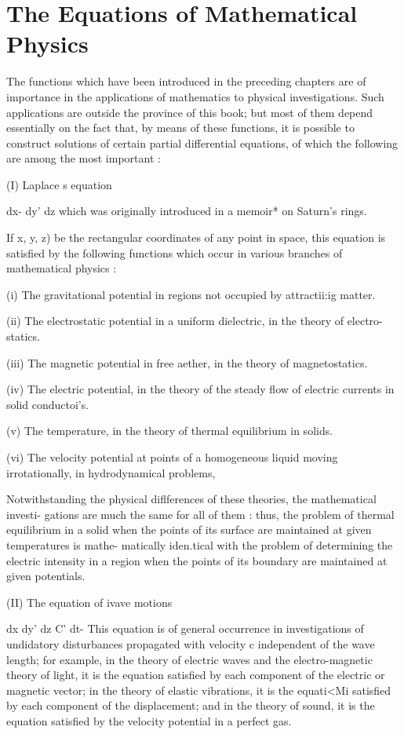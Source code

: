 \chapter{The Equations of Mathematical Physics} 


The functions which have been introduced in the preceding chapters are
of importance in the applications of mathematics to physical
investigations. Such applications are outside the province of this
book; but most of them depend essentially on the fact that, by means
of these functions, it is possible to construct solutions of certain
partial differential equations, of which the following are among the
most important :

(I) Laplace s equation

dx- dy' dz which was originally introduced in a memoir* on Saturn's
rings.

If x, y, z) be the rectangular coordinates of any point in space, this
equation is satisfied by the following functions which occur in
various branches of mathematical physics :

(i) The gravitational potential in regions not occupied by
attractii:ig matter.

(ii) The electrostatic potential in a uniform dielectric, in the
theory of electro- statics.

(iii) The magnetic potential in free aether, in the theory of
magnetostatics.

(iv) The electric potential, in the theory of the steady flow of
electric currents in solid conductoi's.

(v) The temperature, in the theory of thermal equilibrium in solids.

(vi) The velocity potential at points of a homogeneous liquid moving
irrotationally, in hydrodynamical problems,

Notwithstanding the physical diflferences of these theories, the
mathematical investi- gations are much the same for all of them :
thus, the problem of thermal equilibrium in a solid when the points of
its surface are maintained at given temperatures is mathe- matically
iden.tical with the problem of determining the electric intensity in a
region when the points of its boundary are maintained at given
potentials.

(II) The equation of ivave motions

dx dy' dz C' dt- This equation is of general occurrence in
investigations of undidatory disturbances propagated with velocity c
independent of the wave length; for example, in the theory of
electric waves and the electro-magnetic theory of light, it is the
equation satisfied by each component of the electric or magnetic
vector; in the theory of elastic vibrations, it is the equati<Mi
satisfied by each component of the displacement; and in the theory of
sound, it is the equation satisfied by the velocity potential in a
perfect gas.

